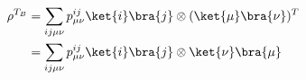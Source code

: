 \begin{equation}\label{eqn:rho_TB}
\begin{split}
      \rho^{T_B} &= \sum_{ij\mu\nu}p^{ij}_{\mu\nu}\ket{i}\bra{j} \otimes (\ket{\mu}\bra{\nu})^T \\
    &= \sum_{ij\mu\nu} p^{ij}_{\mu\nu} \ket{i}\bra{j} \otimes \ket{\nu}\bra{\mu}
\end{split}
\end{equation}
